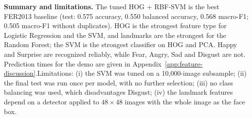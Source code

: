 \textbf{Summary and limitations.} The tuned HOG + RBF-SVM is the best FER2013 baseline (test: 0.575 accuracy, 0.550 balanced accuracy, 0.568 macro-F1; 0.505 macro-F1 without duplicates). HOG is the strongest feature type for Logistic Regression and the SVM, and landmarks are the strongest for the Random Forest; the SVM is the strongest classifier on HOG and PCA. Happy and Surprise are recognized reliably, while Fear, Angry, Sad and Disgust are not. Prediction times for the demo are given in Appendix~\ref{app:feature-discussion}.Limitations: (i) the SVM was tuned on a 10,000-image subsample; (ii) the final test was run once per model, with no further selection; (iii) no class balancing was used, which disadvantages Disgust; (iv) the landmark features depend on a detector applied to $48\times48$ images with the whole image as the face box.
